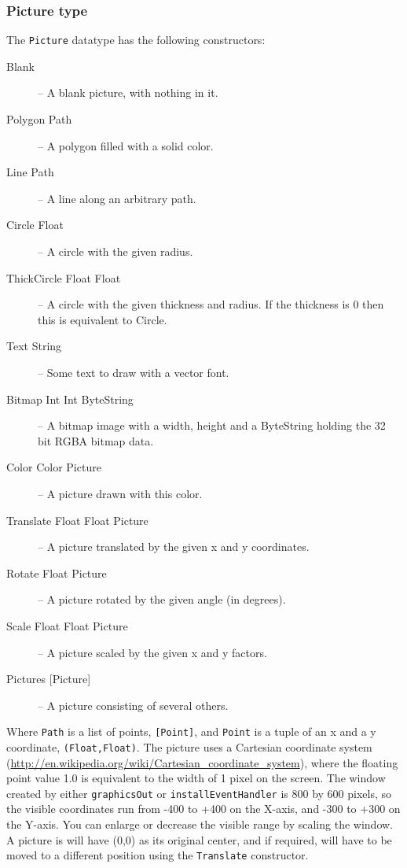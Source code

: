 \subsubsection{Picture type}
The \texttt{Picture} datatype has the following constructors:
\begin{description}
  \item[Blank] -- A blank picture, with nothing in it.
  \item[Polygon Path] --  A polygon filled with a solid color.
  \item[Line Path] --  A line along an arbitrary path.
  \item[Circle Float] --  A circle with the given radius.
  \item[ThickCircle Float Float] -- A circle with the given thickness and radius. If the thickness is 0 then this is equivalent to Circle.
  \item[Text String] -- Some text to draw with a vector font.
  \item[Bitmap Int Int ByteString] -- A bitmap image with a width, height and a ByteString holding the 32 bit RGBA bitmap data.
  \item[Color Color Picture] -- A picture drawn with this color.
  \item[Translate Float Float Picture] -- A picture translated by the given x and y coordinates.
  \item[Rotate Float Picture] -- A picture rotated by the given angle (in degrees).
  \item[Scale Float Float Picture] -- A picture scaled by the given x and y factors.
  \item[Pictures {[Picture]}] -- A picture consisting of several others. 
\end{description}
Where \texttt{Path} is a list of points, \texttt{[Point]}, and \texttt{Point} is a tuple of an x and a y coordinate, \texttt{(Float,Float)}. The picture uses a Cartesian coordinate system (\url{http://en.wikipedia.org/wiki/Cartesian_coordinate_system}), where the floating point value 1.0 is equivalent to the width of 1 pixel on the screen. 
The window created by either \texttt{graphicsOut} or \texttt{installEventHandler} is 800 by 600 pixels, so the visible coordinates run from -400 to +400 on the X-axis, and -300 to +300 on the Y-axis. 
You can enlarge or decrease the visible range by scaling the window.
A picture is will have (0,0) as its original center, and if required, will have to be moved to a different position using the \texttt{Translate} constructor. 

